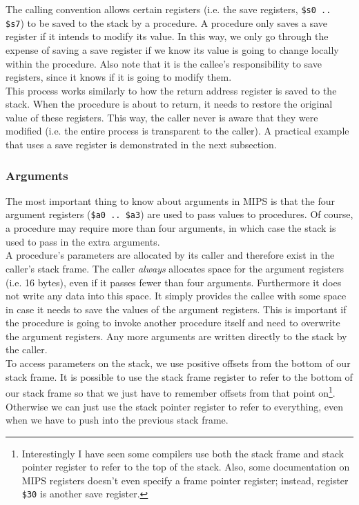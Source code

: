\documentclass[12pt]{article}
\begin{document}
The calling convention allows certain registers (i.e. the save registers,
     \texttt{\$s0 .. \$s7}) to be saved to the stack by a procedure. A procedure
     only saves a save register if it intends to modify its value. In this way,
     we only go through the expense of saving a save register if we know its
     value is going to change locally within the procedure. Also note that it is
     the callee's responsibility to save registers, since it knows if it is
     going to modify them.\\

This process works similarly to how the return address register is saved to the
     stack. When the procedure is about to return, it needs to restore the
     original value of these registers. This way, the caller never is aware that
     they were modified (i.e. the entire process is transparent to the
     caller). A practical example that uses a save register is demonstrated in
     the next subsection.

\subsubsection{Arguments}

The most important thing to know about arguments in MIPS is that the four
     argument registers (\texttt{\$a0 .. \$a3}) are used to pass values to
     procedures. Of course, a procedure may require more than four arguments, in
     which case the stack is used to pass in the extra arguments.\\

A procedure's parameters are allocated by its caller and therefore exist in the
     caller's stack frame. The caller \textit{always} allocates space for the
     argument registers (i.e. 16 bytes), even if it passes fewer than four
     arguments. Furthermore it does not write any data into this space. It
     simply provides the callee with some space in case it needs to save the
     values of the argument registers. This is important if the procedure is
     going to invoke another procedure itself and need to overwrite the argument
     registers. Any more arguments are written directly to the stack by the
     caller.\\

To access parameters on the stack, we use positive offsets from the bottom of
     our stack frame. It is possible to use the stack frame register to refer to
     the bottom of our stack frame so that we just have to remember offsets from
     that point on\footnote{Interestingly I have seen some compilers use both
     the stack frame and stack pointer register to refer to the top of the
     stack. Also, some documentation on MIPS registers doesn't even specify a
     frame pointer register; instead, register \texttt{\$30} is another save
     register.}. Otherwise we can just use the stack pointer register to refer
     to everything, even when we have to push into the previous stack frame.\\
\end{document}
